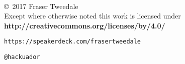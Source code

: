 \documentclass[ignorenonframetext,aspectratio=169]{beamer}
\begin{document}
\begin{frame}[plain]




    \setlength{\parskip}{.5em}

    { \centering

    
    \\
    \copyright~2017  Fraser Tweedale
    \\
    { \scriptsize
    Except where otherwise noted this work is licensed under
    }\\
    { \footnotesize
    \textbf{http://creativecommons.org/licenses/by/4.0/}
    }

    \bigskip
    \Large

    \texttt{https://speakerdeck.com/frasertweedale}

    \texttt{@hackuador}

    }


\end{frame}
\end{document}

